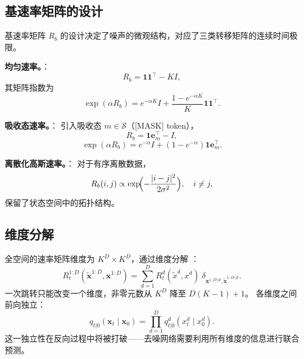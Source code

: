 \documentclass[12pt,a4paper]{ctexbook}
\theoremstyle{definition}
\begin{document}
\subsection{基速率矩阵的设计}

基速率矩阵 $R_b$ 的设计决定了噪声的微观结构，对应了三类转移矩阵的连续时间极限。

\textbf{均匀速率。}\cite[§3]{austin2021d3pm}\cite[§4.1]{campbell2022ctmc}：
\begin{equation}
R_b = \mathbf{1} \mathbf{1}^\top - K I, \label{eq:uniform-rate}
\end{equation}
其矩阵指数为
\begin{equation}
\exp(\alpha R_b) = e^{-\alpha K} I + \frac{1 - e^{-\alpha K}}{K} \mathbf{1} \mathbf{1}^\top. \label{eq:uniform-exp}
\end{equation}

\textbf{吸收态速率。}\cite[§3]{austin2021d3pm}\cite[§4.1]{campbell2022ctmc}：
引入吸收态 $m \in \mathcal{S}$（[MASK] token），
\begin{equation}
R_b = \mathbf{1} \mathbf{e}_m^\top - I, \label{eq:absorbing-rate}
\end{equation}
\begin{equation}
\exp(\alpha R_b) = e^{-\alpha} I + (1 - e^{-\alpha}) \mathbf{1} \mathbf{e}_m^\top. \label{eq:absorbing-exp}
\end{equation}

\textbf{离散化高斯速率。}\cite[§3]{austin2021d3pm}：
对于有序离散数据，
\begin{equation}
R_b(i, j) \propto \exp\!\Bigl( -\frac{|i - j|^2}{2\sigma^2} \Bigr), \quad i \neq j, \label{eq:gaussian-rate}
\end{equation}
保留了状态空间中的拓扑结构。

\subsection{维度分解}
\label{sec:dim-decomp}

全空间的速率矩阵维度为 $K^D \times K^D$，通过维度分解 \cite[§4.2 Proposition 3]{campbell2022ctmc}：
\begin{equation}
R_t^{1:D}(\tilde{\boldsymbol{x}}^{1:D}, \boldsymbol{x}^{1:D}) = \sum_{d=1}^D R_t^d(\tilde{x}^d, x^d) \;\delta_{\boldsymbol{x}^{1:D \setminus d}, \tilde{\boldsymbol{x}}^{1:D \setminus d}}. \label{eq:dim-decomp-rate}
\end{equation}
一次跳转只能改变一个维度，非零元数从 $K^D$ 降至 $D(K-1)+1$。
各维度之间前向独立：
\begin{equation}
q_{t|0}(\boldsymbol{x}_t \mid \boldsymbol{x}_0) = \prod_{d=1}^D q_{t|0}^d(x_t^d \mid x_0^d). \label{eq:dim-independence}
\end{equation}
这一独立性在反向过程中将被打破——去噪网络需要利用所有维度的信息进行联合预测。
\end{document}
